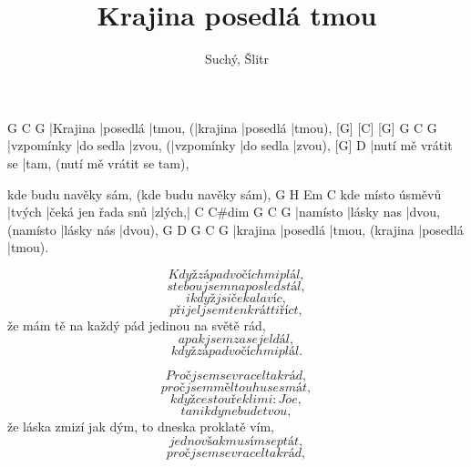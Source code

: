 \documentclass{song}
\title{Krajina posedlá tmou}
\author{Suchý, Šlitr}
\begin{document}
\strophe
[G]     [C]      [G]      G        C        G
|Krajina |posedlá |tmou, (|krajina |posedlá |tmou),
[G]       [C]        [G]     G          C         G
|vzpomínky |do sedla |zvou, (|vzpomínky |do sedla |zvou),
[G]                D
|nutí mě vrátit se |tam, (nutí mě vrátit se tam),

kde budu navěky sám, (kde budu navěky sám),
                 G      H\7                Em     C
kde místo úsměvů |tvých |čeká jen řada snů |zlých,|
C        C\#dim     G              C          G
|namísto |lásky nas |dvou, (namísto |lásky nás |dvou),
G        D\7      G              C        G
|krajina |posedlá |tmou, (krajina |posedlá |tmou).
\endstrophe

\strophe*
\[ Když západ v očích mi plál, \]
\[ s tebou jsem naposled stál, \]
\[ i když jsi čekala víc, \]
\[ přijel jsem tenkrát ti říct, \]
že mám tě na každý pád jedinou na světě rád,
\[ a pak jsem zase jel dál, \]
\[ když západ v očích mi plál. \]
\endstrophe

\strophe*
\[ Proč jsem se vracel tak rád, \]
\[ proč jsem měl touhu se smát, \]
\[ když cestou řekli mi: Joe, \]
\[ ta nikdy nebude tvou, \]
že láska zmizí jak dým, to dneska proklatě vím,
\[ jedno však musím se ptát, \]
\[ proč jsem se vracel tak rád, \]
\endstrophe
\end{document}
